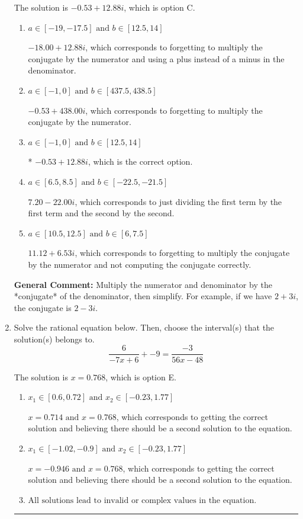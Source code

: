 \documentclass{extbook}[14pt]
\newcommand{\litem}[1]{\item #1

\rule{\textwidth}{0.4pt}}
\begin{document}
\begin{enumerate}
{The solution is \( -0.53  + 12.88 i \), which is option C.\begin{enumerate}[label=\Alph*.]
\item \( a \in [-19, -17.5] \text{ and } b \in [12.5, 14] \)

 $-18.00  + 12.88 i$, which corresponds to forgetting to multiply the conjugate by the numerator and using a plus instead of a minus in the denominator.
\item \( a \in [-1, 0] \text{ and } b \in [437.5, 438.5] \)

 $-0.53  + 438.00 i$, which corresponds to forgetting to multiply the conjugate by the numerator.
\item \( a \in [-1, 0] \text{ and } b \in [12.5, 14] \)

* $-0.53  + 12.88 i$, which is the correct option.
\item \( a \in [6.5, 8.5] \text{ and } b \in [-22.5, -21.5] \)

 $7.20  - 22.00 i$, which corresponds to just dividing the first term by the first term and the second by the second.
\item \( a \in [10.5, 12.5] \text{ and } b \in [6, 7.5] \)

 $11.12  + 6.53 i$, which corresponds to forgetting to multiply the conjugate by the numerator and not computing the conjugate correctly.
\end{enumerate}

\textbf{General Comment:} Multiply the numerator and denominator by the *conjugate* of the denominator, then simplify. For example, if we have $2+3i$, the conjugate is $2-3i$.
}
\litem{
Solve the rational equation below. Then, choose the interval(s) that the solution(s) belongs to.
\[ \frac{6}{-7x + 6} + -9 = \frac{-3}{56x -48} \]

The solution is \( x = 0.768 \), which is option E.\begin{enumerate}[label=\Alph*.]
\item \( x_1 \in [0.6, 0.72] \text{ and } x_2 \in [-0.23,1.77] \)

$x = 0.714 \text{ and } x = 0.768$, which corresponds to getting the correct solution and believing there should be a second solution to the equation.
\item \( x_1 \in [-1.02, -0.9] \text{ and } x_2 \in [-0.23,1.77] \)

$x = -0.946 \text{ and } x = 0.768$, which corresponds to getting the correct solution and believing there should be a second solution to the equation.
\item \( \text{All solutions lead to invalid or complex values in the equation.} \)


\end{enumerate}}
\end{enumerate}
\end{document}
